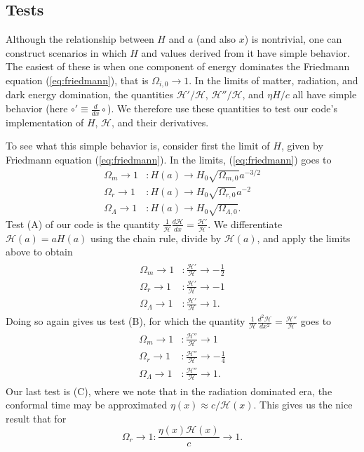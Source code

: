 \documentclass[aps,prl,twocolumn,groupedaddress,nofootinbib]{revtex4-2}
\newcommand{\Oio}{\Omega_{i,0}}
\newcommand{\Om}{\Omega_m}
\newcommand{\Omo}{\Omega_{m,0}}
\newcommand{\Or}{\Omega_r}
\newcommand{\Oro}{\Omega_{r,0}}
\newcommand{\Ol}{\Omega_\Lambda}
\newcommand{\Olo}{\Omega_{\Lambda,0}}
\newcommand{\Hp}{\mathcal{H}}
\newcommand{\der}[2][]{\frac{d#1}{d#2}}
\newcommand{\dd}[2][]{\frac{d^2#1}{d#2^2}}
\begin{document}
\subsection{Tests}
Although the relationship between $H$ and $a$ (and also $x$) is nontrivial, one can construct scenarios in which $H$ and values derived from it have simple behavior. The easiest of these is when one component of energy dominates the Friedmann equation (\ref{eq:friedmann}), that is $\Oio \to 1$. In the limits of matter, radiation, and dark energy domination, the quantities $\Hp'/\Hp$, $\Hp''/\Hp$, and $\eta H/c$ all have simple behavior (here $\circ'\equiv\der{x}\circ$). We therefore use these quantities to test our code's implementation of $H$, $\Hp$, and their derivatives.

To see what this simple behavior is, consider first the limit of $H$, given by Friedmann equation (\ref{eq:friedmann}). In the limits, (\ref{eq:friedmann}) goes to
\begin{align*}
    \Om \to 1 & : H(a)\to H_0\sqrt{\Omo}a^{-3/2} \\
    \Or \to 1 & : H(a)\to H_0\sqrt{\Oro}a^{-2}   \\
    \Ol \to 1 & : H(a)\to H_0\sqrt{\Olo}.
\end{align*}
Test (A) of our code is the quantity $\frac{1}{\Hp}\der[\Hp]{x}=\frac{\Hp'}{\Hp}$. We differentiate $\Hp(a)=aH(a)$ using the chain rule, divide by $\Hp(a)$, and apply the limits above to obtain
\begin{align}
    \begin{split}
        \label{eq:a}
        \Om \to 1 & : \frac{\Hp'}{\Hp} \to -\frac{1}{2} \\
        \Or \to 1 & : \frac{\Hp'}{\Hp} \to -1           \\
        \Ol \to 1 & : \frac{\Hp'}{\Hp} \to 1.
    \end{split}
\end{align}
Doing so again gives us test (B), for which the quantity $\frac{1}{\Hp}\dd[\Hp]{x}=\frac{\Hp''}{\Hp}$ goes to
\begin{align}
    \begin{split}
        \label{eq:b}
        \Om \to 1 & : \frac{\Hp''}{\Hp} \to 1            \\
        \Or \to 1 & : \frac{\Hp''}{\Hp} \to -\frac{1}{4} \\
        \Ol \to 1 & : \frac{\Hp''}{\Hp} \to 1.
    \end{split}
\end{align}
Our last test is (C), where we note that in the radiation dominated era, the conformal time may be approximated $\eta(x)\approx c/\Hp(x)$. This gives us the nice result that for
\begin{equation}
    \label{eq:c}
    \Or \to 1: \frac{\eta(x) \Hp(x)}{c} \to 1.
\end{equation}
\end{document}
